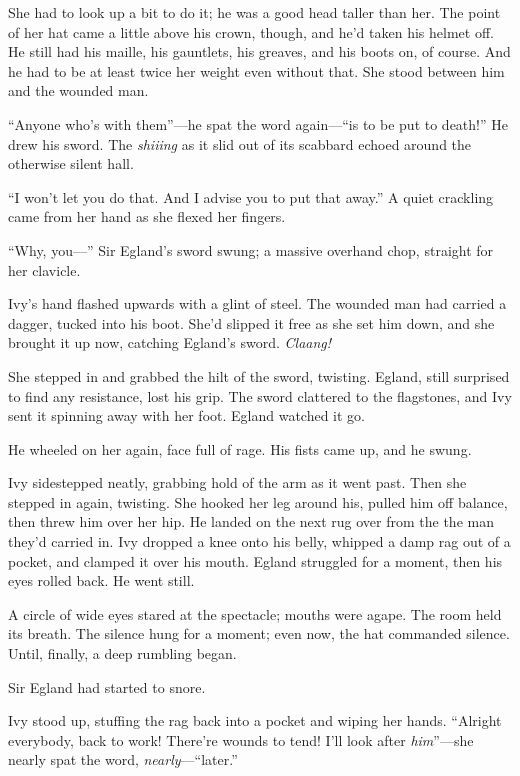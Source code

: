 She had to look up a bit to do it; he was a good head taller than her.
The point of her hat came a little above his crown, though, and he'd taken his helmet off.
He still had his maille, his gauntlets, his greaves, and his boots on, of course.
And he had to be at least twice her weight even without that.
She stood between him and the wounded man.

``Anyone who's with them''---he spat the word again---``is to be put to death!''
He drew his sword.
The \emph{shiiing} as it slid out of its scabbard echoed around the otherwise silent hall.

``I won't let you do that.
And I advise you to put that away.''
A quiet crackling came from her hand as she flexed her fingers.

``Why, you---''
Sir Egland's sword swung; a massive overhand chop, straight for her clavicle.

Ivy's hand flashed upwards with a glint of steel.
The wounded man had carried a dagger, tucked into his boot.
She'd slipped it free as she set him down, and she brought it up now, catching Egland's sword.
\emph{Claang!}

She stepped in and grabbed the hilt of the sword, twisting.
Egland, still surprised to find any resistance, lost his grip.
The sword clattered to the flagstones, and Ivy sent it spinning away with her foot.
Egland watched it go.

He wheeled on her again, face full of rage.
His fists came up, and he swung.

Ivy sidestepped neatly, grabbing hold of the arm as it went past.
Then she stepped in again, twisting.
She hooked her leg around his, pulled him off balance, then threw him over her hip.
He landed on the next rug over from the the man they'd carried in.
Ivy dropped a knee onto his belly, whipped a damp rag out of a pocket, and clamped it over his mouth.
Egland struggled for a moment, then his eyes rolled back.
He went still.

A circle of wide eyes stared at the spectacle; mouths were agape.
The room held its breath.
The silence hung for a moment; even now, the hat commanded silence.
Until, finally, a deep rumbling began.

Sir Egland had started to snore.

Ivy stood up, stuffing the rag back into a pocket and wiping her hands.
``Alright everybody, back to work!
There're wounds to tend!
I'll look after \emph{him}''---she nearly spat the word, \emph{nearly}---``later.''

